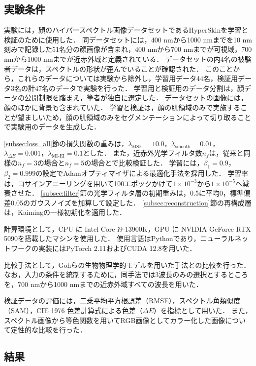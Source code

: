 \documentclass[MIRU,submit]{miru2026j}
\begin{document}
\subsection{実験条件}
実験には，顔のハイパースペクトル画像データセットであるHyperSkinを学習と検証のために使用した\cite{proc:ng}．
同データセットには，400 nmから1000 nmまでを10 nm刻みで記録した51名分の顔画像が含まれ，400 nmから700 nmまでが可視域，700 nmから1000 nmまでが近赤外域と定義されている．
データセットの内4名の被験者データは，スペクトルの形状が歪んでいることが確認された．
このことから，これらのデータについては実験から除外し，学習用データ44名，検証用データ3名の計47名のデータで実験を行った．
学習用と検証用のデータ分割は，顔データの公開制限を踏まえ，筆者が独自に選定した．
データセットの画像には，顔のほかに背景も含まれていた．
学習と検証は，顔の肌領域のみで実施することが望ましいため，顔の肌領域のみをセグメンテーション\cite{segface}によって切り取ることで実験用のデータを生成した．

\ref{subsec:loss_all}節の損失関数の重みは，$\lambda_{\mathrm{MSE}} = 10.0$，$\lambda_{\mathrm{smooth}} = 0.01$，$\lambda_{\Delta E} = 0.001$，$\lambda_{\mathrm{MI\text{-}EI}} = 0.1$とした．
また，近赤外光学フィルタ数$n_f$は，従来\cite{proc:higashi}と同様の$n_f = 3$の場合と$n_f = 5$の場合とで比較検証した．
学習には，$\beta_1=0.9$，$\beta_2=0.999$の設定でAdamオプティマイザによる最適化手法を採用した．
学習率は，コサインアニーリングを用いて100エポックかけて$1 \times 10^{-3}$から$1 \times 10^{-5}$へ減衰させた．
\ref{subsec:filter}節の光学フィルタ層の初期重みは，0.5に平均0，標準偏差0.05のガウスノイズを加算して設定した．
\ref{subsec:reconstruction}節の再構成層は，Kaimingの一様初期化を適用した．

計算環境として，CPU に Intel Core i9-13900K，GPU に NVIDIA GeForce RTX 5090を搭載したマシンを使用した．
使用言語はPythonであり，ニューラルネットワークの実装にはPyTorch 2.11およびCUDA 12.8を用いた．

比較手法として，Gohらの生物物理学的モデルを用いた手法\cite{proc:goh}との比較を行った．
なお，入力の条件を統制するために，同手法では3波長のみの選択とするところを，700 nmから1000 nmまでの近赤外域すべての波長を用いた．

検証データの評価には，二乗平均平方根誤差（RMSE），スペクトル角類似度（SAM），CIE 1976 色差計算式による色差（$\Delta E$）を指標として用いた．
また，スペクトル画像から等色関数を用いてRGB画像としてカラー化した画像について定性的な比較を行った．

\subsection{結果}
\end{document}
